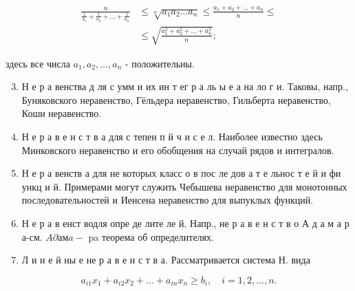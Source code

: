 \documentclass[10pt]{article}
\begin{document}
\[

\begin{aligned}

\frac{n}{\frac{1}{a_{1}}+\frac{1}{a_{2}}+\ldots+\frac{1}{a_{n}}} & \leqslant \sqrt[n]{a_{1} a_{2} \ldots a_{n}} \leqslant \frac{a_{1}+a_{2}+\ldots+a_{n}}{n} \leqslant \\

& \leqslant \sqrt{\frac{a_{1}^{2}+a_{2}^{2}+\ldots+a_{n}^{2}}{n}} ;

\end{aligned}

\]



здесь все числа $a_{1}, a_{2}, \ldots, a_{n}$ - положительны.



\begin{enumerate}

  \setcounter{enumi}{2}

  \item Н е р а венства д ля с умм и их ин т ег р а ль ы е а на ло г и. Таковы, напр., Буняковского неравенство, Гёльдера неравенство, Гильберта неравенство, Коши неравенство.



  \item Н е р а в е н с т в а для с тепен п й ч и с е л. Наиболее известно здесь Минковского неравенство и его обобщения на случай рядов и интегралов.



  \item Н е р а венств а для не которых класс о в пос ле дов а т е льнос т е й и фи ункц и й. Примерами могут служить Чебышева неравенство для монотонных последовательностей и Иенсена неравенство для выпуклых функций.



  \item Н е р а в енст водля опре де лите ле й. Напр., не р а в е н с т в о А д а м а р а-см. $A \partial а м a-$ pa теорема об определителях.



  \item Л и н е й ны е не р а в е н с т в а. Рассматривается система Н. вида



\end{enumerate}



\[

a_{i 1} x_{1}+a_{i 2} x_{2}+\ldots+a_{i n} x_{n} \geqslant b_{i}, \quad i=1,2, \ldots, n .

\]
\end{document}
